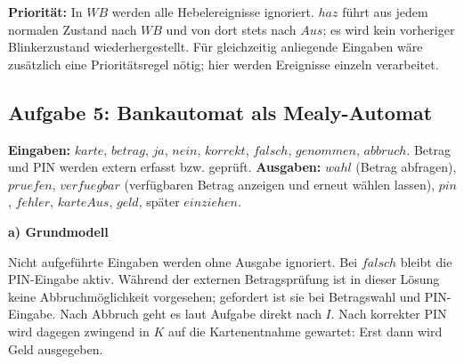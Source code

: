 \textbf{Priorität:} In $WB$ werden alle Hebelereignisse ignoriert. $haz$ führt aus jedem normalen Zustand nach $WB$ und von dort stets nach $Aus$; es wird kein vorheriger Blinkerzustand wiederhergestellt. Für gleichzeitig anliegende Eingaben wäre zusätzlich eine Prioritätsregel nötig; hier werden Ereignisse einzeln verarbeitet.
\newpage
\subsection*{Aufgabe 5: Bankautomat als Mealy-Automat}
\textbf{Eingaben:} $karte$, $betrag$, $ja$, $nein$, $korrekt$, $falsch$, $genommen$, $abbruch$. Betrag und PIN werden extern erfasst bzw. geprüft. \textbf{Ausgaben:} $wahl$ (Betrag abfragen), $pruefen$, $verfuegbar$ (verfügbaren Betrag anzeigen und erneut wählen lassen), $pin$, $fehler$, $karteAus$, $geld$, später $einziehen$.

\textbf{a) Grundmodell}
\begin{center}
\end{center}
Nicht aufgeführte Eingaben werden ohne Ausgabe ignoriert. Bei $falsch$ bleibt die PIN-Eingabe aktiv. Während der externen Betragsprüfung ist in dieser Lösung keine Abbruchmöglichkeit vorgesehen; gefordert ist sie bei Betragswahl und PIN-Eingabe. Nach Abbruch geht es laut Aufgabe direkt nach $I$. Nach korrekter PIN wird dagegen zwingend in $K$ auf die Kartenentnahme gewartet: Erst dann wird Geld ausgegeben.

